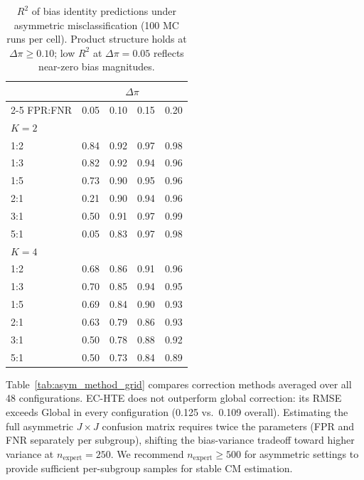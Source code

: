 \begin{table}[h]
\centering
\caption{$R^2$ of bias identity predictions under asymmetric misclassification (100 MC runs per cell). Product structure holds at $\Delta\pi \geq 0.10$; low $R^2$ at $\Delta\pi = 0.05$ reflects near-zero bias magnitudes.}
\label{tab:asym_r2_grid}
\small
\begin{tabular}{l cccc}
\toprule
& \multicolumn{4}{c}{$\Delta\pi$} \\
\cmidrule(lr){2-5}
FPR:FNR & 0.05 & 0.10 & 0.15 & 0.20 \\
\midrule
\multicolumn{5}{l}{\emph{$K = 2$}} \\
1:2 & 0.84 & 0.92 & 0.97 & 0.98 \\
1:3 & 0.82 & 0.92 & 0.94 & 0.96 \\
1:5 & 0.73 & 0.90 & 0.95 & 0.96 \\
2:1 & 0.21 & 0.90 & 0.94 & 0.96 \\
3:1 & 0.50 & 0.91 & 0.97 & 0.99 \\
5:1 & 0.05 & 0.83 & 0.97 & 0.98 \\
\midrule
\multicolumn{5}{l}{\emph{$K = 4$}} \\
1:2 & 0.68 & 0.86 & 0.91 & 0.96 \\
1:3 & 0.70 & 0.85 & 0.94 & 0.95 \\
1:5 & 0.69 & 0.84 & 0.90 & 0.93 \\
2:1 & 0.63 & 0.79 & 0.86 & 0.93 \\
3:1 & 0.50 & 0.78 & 0.88 & 0.92 \\
5:1 & 0.50 & 0.73 & 0.84 & 0.89 \\
\bottomrule
\end{tabular}
\end{table}

Table~\ref{tab:asym_method_grid} compares correction methods averaged over all 48 configurations.
EC-HTE does not outperform global correction: its RMSE exceeds Global in every configuration (0.125 vs.\ 0.109 overall).
Estimating the full asymmetric $J{\times}J$ confusion matrix requires twice the parameters (FPR and FNR separately per subgroup), shifting the bias-variance tradeoff toward higher variance at $n_{\text{expert}} = 250$.
We recommend $n_{\text{expert}} \geq 500$ for asymmetric settings to provide sufficient per-subgroup samples for stable CM estimation.

